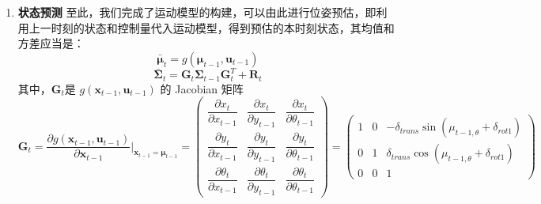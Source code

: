 \documentclass[../main.tex]{subfiles}
\begin{document}
\begin{enumerate}
{{\begin{enumerate}
    在具体代入时：
    $$
    \mathbf{V}_t =
    \begin{pmatrix}
      -\delta_{trans}\sin(\mu_{t-1,\theta} + \delta_{rot1}) & \cos(\mu_{t-1,\theta} + \delta_{rot1}) & 0\\[6pt]
      \delta_{trans}\cos(\mu_{t-1,\theta} + \delta_{rot1}) & \sin(\mu_{t-1,\theta} + \delta_{rot1}) & 0\\[6pt]
      1 & 0 & 1
    \end{pmatrix}
    $$
    \item \textbf{状态预测}
    至此，我们完成了运动模型的构建，可以由此进行位姿预估，即利用上一时刻的状态和控制量代入运动模型，得到预估的本时刻状态，其均值和方差应当是：
    $$
    \bar{\boldsymbol{\mu}}_t = g(\boldsymbol{\mu}_{t-1},\mathbf{u}_{t-1})
    $$
    $$
    \bar{\boldsymbol{\Sigma}}_t = \mathbf{G}_t \boldsymbol{\Sigma}_{t-1} \mathbf{G}_t^T + \mathbf{R}_t
    $$
    其中，$\mathbf{G}_t$是 $g(\mathbf{x}_{t-1},\mathbf{u}_{t-1})$ 的 Jacobian 矩阵
    $$
    \mathbf{G}_t = \frac{\partial g(\mathbf{x}_{t-1},\mathbf{u}_{t-1})}{\partial \mathbf{x}_{t-1}}\bigg|_{\mathbf{x}_{t-1}=\boldsymbol{\mu}_{t-1}}
    =
    \begin{pmatrix}
      \dfrac{\partial x_t}{\partial x_{t-1}} & \dfrac{\partial x_t}{\partial y_{t-1}} & \dfrac{\partial x_t}{\partial \theta_{t-1}}\\[6pt]
      \dfrac{\partial y_t}{\partial x_{t-1}} & \dfrac{\partial y_t}{\partial y_{t-1}} & \dfrac{\partial y_t}{\partial \theta_{t-1}}\\[6pt]
      \dfrac{\partial \theta_t}{\partial x_{t-1}} & \dfrac{\partial \theta_t}{\partial y_{t-1}} & \dfrac{\partial \theta_t}{\partial \theta_{t-1}}
    \end{pmatrix}
    =
    \begin{pmatrix}
      1 & 0 & -\delta_{trans}\sin(\mu_{t-1,\theta} + \delta_{rot1})\\[6pt]
      0 & 1 & \delta_{trans}\cos(\mu_{t-1,\theta} + \delta_{rot1})\\[6pt]
      0 & 0 & 1
    \end{pmatrix}
    $$


\end{enumerate}}}
\end{enumerate}
\end{document}
